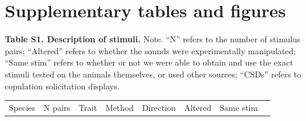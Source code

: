 \documentclass[
]{article}
\begin{document}
\clearpage

\section{Supplementary tables and
figures}\label{supplementary-tables-and-figures}

\footnotesize

\textbf{Table S1. Description of stimuli.} Note. ``N'' refers to the
number of stimulus pairs; ``Altered'' refers to whether the sounds were
experimentally manipulated; ``Same stim'' refers to whether or not we
were able to obtain and use the exact stimuli tested on the animals
themselves, or used other sources; ``CSDs'' refers to copulation
solicitation displays.

\begin{longtable}[]{@{}
  >{\raggedright\arraybackslash}p{}
  >{\raggedleft\arraybackslash}p{}
  >{\raggedright\arraybackslash}p{}
  >{\raggedright\arraybackslash}p{}
  >{\raggedright\arraybackslash}p{}
  >{\raggedright\arraybackslash}p{}
  >{\raggedright\arraybackslash}p{}
  >{\raggedright\arraybackslash}p{}@{}}
\toprule\noalign{}
\begin{minipage}[b]{\linewidth}\raggedright
Species
\end{minipage} & \begin{minipage}[b]{\linewidth}\raggedleft
N pairs
\end{minipage} & \begin{minipage}[b]{\linewidth}\raggedright
Trait
\end{minipage} & \begin{minipage}[b]{\linewidth}\raggedright
Method
\end{minipage} & \begin{minipage}[b]{\linewidth}\raggedright
Direction
\end{minipage} & \begin{minipage}[b]{\linewidth}\raggedright
Altered
\end{minipage} & \begin{minipage}[b]{\linewidth}\raggedright
Same stim
\end{minipage} & \begin{minipage}[b]{\linewidth}\raggedright

\end{minipage}
\end{longtable}
\end{document}

